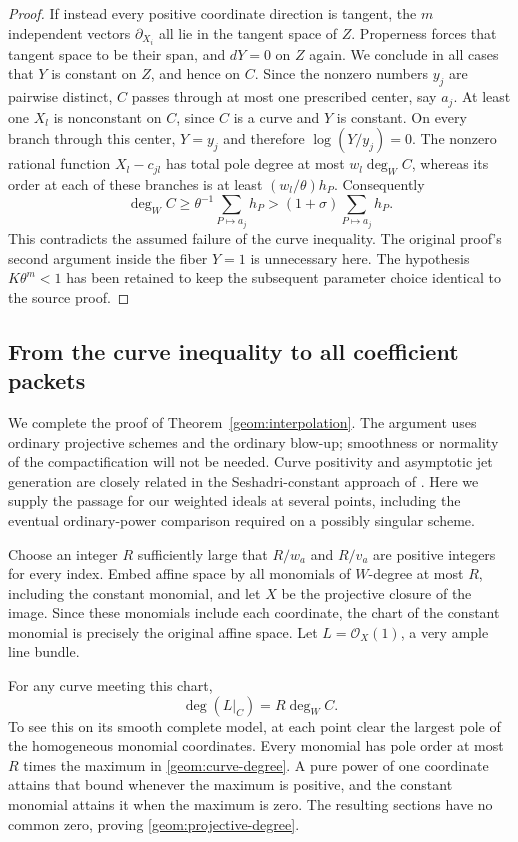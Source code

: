 \documentclass[11pt]{article}
\theoremstyle{definition}
\theoremstyle{remark}
\numberwithin{equation}{section}
\begin{document}
\begin{proof}
If instead every positive coordinate direction is tangent, the $m$
independent vectors $\partial_{X_i}$ all lie in the tangent space of
$Z$. Properness forces that tangent space to be their span, and
$dY=0$ on $Z$ again. We conclude in all cases that $Y$ is constant
on $Z$, and hence on $C$. Since the nonzero numbers $y_j$ are pairwise
distinct, $C$ passes through at most one prescribed center, say $a_j$.
At least one $X_l$ is nonconstant on $C$, since $C$ is a curve and $Y$
is constant. On every branch through this center, $Y=y_j$ and therefore
$\log(Y/y_j)=0$. The nonzero rational function $X_l-c_{jl}$ has total
pole degree at most $w_l\deg_W C$, whereas its order at each of these
branches is at least $(w_l/\theta)h_P$. Consequently
\[
 \deg_W C\ge\theta^{-1}\sum_{P\mapsto a_j}h_P
           >(1+\sigma)\sum_{P\mapsto a_j}h_P.
\]
This contradicts the assumed failure of the curve inequality.
The original proof's second argument inside the fiber $Y=1$ is
unnecessary here. The hypothesis $K\theta^m<1$ has been retained to
keep the subsequent parameter choice identical to the source proof.
\end{proof}

\subsection{From the curve inequality to all coefficient packets}

We complete the proof of Theorem~\ref{geom:interpolation}. The argument uses
ordinary projective schemes and the ordinary blow-up; smoothness or
normality of the compactification will not be needed. Curve positivity
and asymptotic jet generation are closely related in the Seshadri-constant
approach of \cite[Section~6]{demailly1992}. Here we supply the passage
for our weighted ideals at several points, including the eventual
ordinary-power comparison required on a possibly singular scheme.

Choose an integer $R$ sufficiently large that $R/w_a$ and $R/v_a$ are
positive integers for every index. Embed affine space by all monomials
of $W$-degree at most $R$, including the constant monomial, and let
$X$ be the projective closure of the image. Since these monomials
include each coordinate, the chart of the constant monomial is
precisely the original affine space. Let $L=\mathcal O_X(1)$, a very
ample line bundle.

For any curve meeting this chart,
\begin{equation}
\label{geom:projective-degree}
 \deg(L|_C)=R\deg_W C.
\end{equation}
To see this on its smooth complete model, at each point clear the
largest pole of the homogeneous monomial coordinates. Every monomial
has pole order at most $R$ times the maximum in
\eqref{geom:curve-degree}. A pure power of one coordinate attains
that bound whenever the maximum is positive, and the constant
monomial attains it when the maximum is zero. The resulting sections
have no common zero, proving \eqref{geom:projective-degree}.
\end{document}

